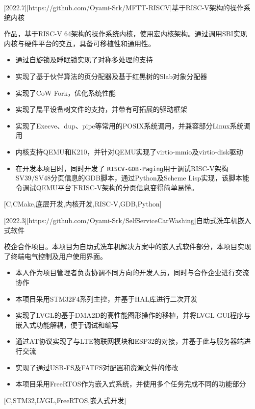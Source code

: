 \documentclass[zh]{resume}
\begin{document}
\begin {projects}
	[2022.7][https://github.com/Oyami-Srk/MFTT-RISCV]{基于RISC-V架构的操作系统内核}{
		作品，基于RISC-V 64架构的操作系统内核，使用宏内核架构。通过调用SBI实现内核与硬件平台的交互，具备可移植性和通用性。
		\begin{itemize}
			\item 通过自旋锁及睡眠锁实现了对称多处理的支持
			\item 实现了基于伙伴算法的页分配器及基于红黑树的Slab对象分配器
			\item 实现了CoW Fork，优化系统性能
			\item 实现了扁平设备树文件的支持，并带有可拓展的驱动框架
			\item 实现了Execve、dup、pipe等常用的POSIX系统调用，并兼容部分Linux系统调用
			\item 内核支持QEMU和K210，并针对QEMU实现了virtio-mmio及virtio-disk驱动
			\item 在开发本项目时，同时开发了 {\texttt{RISCV-GDB-Paging}}用于调试RISC-V架构SV39/SV48分页信息的GDB脚本，通过Python及Scheme Lisp实现，该脚本能令调试QEMU平台下RISC-V架构的分页信息变得简单易懂。
		\end{itemize}
	}[C,CMake,底层开发,内核开发,RISC-V,GDB,Python]

	[2022.3][https://github.com/Oyami-Srk/SelfServiceCarWashing]{自助式洗车机嵌入式软件}{
		校企合作项目。本项目为自助式洗车机解决方案中的嵌入式软件部分，本项目实现了终端电气控制及用户使用界面。
		\begin{itemize}
			\item 本人作为项目管理者负责协调不同方向的开发人员，同时与合作企业进行交流协作
			\item 本项目采用STM32F4系列主控，并基于HAL库进行二次开发
			\item 实现了LVGL的基于DMA2D的高性能图形操作的移植，并将LVGL GUI程序与嵌入式功能解耦，便于调试和编写
			\item 通过AT协议实现了与LTE物联网模块和ESP32的对接，并基于此与服务器端进行交流
			\item 实现了通过USB-FS及FATFS对配置和资源文件的修改
			\item 本项目采用FreeRTOS作为嵌入式系统，并使用多个任务完成不同的功能部分
		\end{itemize}
	}[C,STM32,LVGL,FreeRTOS,嵌入式开发]
\end {projects}
\end{document}
